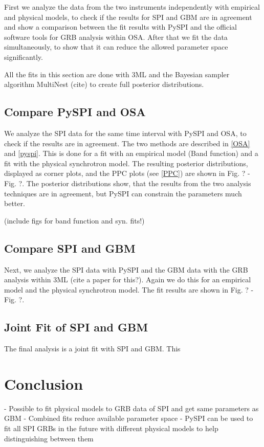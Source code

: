 \documentclass[twocolumn]{aa}
\begin{document}
First we analyze the data from the two instruments independently with empirical and physical models, to check if the results for SPI and GBM are in agreement and show a comparison between the fit results with PySPI and the official software tools for GRB analysis within OSA. After that we fit the data simultaneously, to show that it can reduce the allowed parameter space significantly.

All the fits in this section are done with 3ML and the Bayesian sampler algorithm MultiNest (cite) to create full posterior distributions.

\subsection{Compare PySPI and OSA}

We analyze the SPI data for the same time interval with PySPI and OSA, to check if the results are in agreement. The two methods are described in \ref{OSA} and \ref{pyspi}. This is done for a fit with an empirical model (Band function) and a fit with the physical synchrotron model. The resulting posterior distributions, displayed as corner plots, and the PPC plots (see \ref{PPC}) are shown in Fig. ? - Fig. ?. The posterior distributions show, that the results from the two analysis techniques are in agreement, but PySPI can constrain the parameters much better.

(include figs for band function and syn. fits!)

\subsection{Compare SPI and GBM}

Next, we analyze the SPI data with PySPI and the GBM data with the GRB analysis within 3ML (cite a paper for this?). Again we do this for an empirical model and the physical synchrotron model. The fit results are shown in Fig. ? - Fig. ?.


\subsection{Joint Fit of SPI and GBM}

The final analysis is a joint fit with SPI and GBM. This

\section{Conclusion}

- Possible to fit physical models to GRB data of SPI and get same parameters as GBM
- Combined fits reduce available parameter space
- PySPI can be used to fit all SPI GRBs in the future with different physical models to help distinguishing between them
\end{document}
